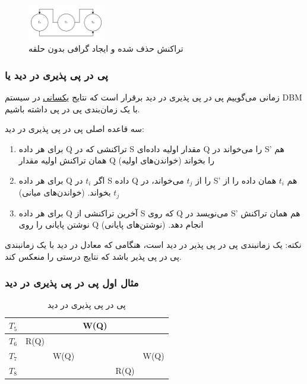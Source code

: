 \documentclass[a4paper]{article}
\begin{document}
\begin{figure}
    \centering
    \includegraphics[width=0.3\textwidth]{umls/exp1_solved.jpg}
    \caption{تراکنش حذف شده و ایجاد گرافی بدون حلقه}
    \label{fig: diagram}
\end{figure}

\subsubsection{پی در پی پذیری در دید یا }

زمانی می‌گوییم پی در پی پذیری در دید برقرار است که نتایج \underline{یکسانی} در
سیستم DBM با یک زمان‌بندی پی در پی داشته باشیم.

سه قاعده اصلی پی در پی پذیری در دید:

\begin{enumerate}
    \item برای هر داده Q تراکنشی که در S مقدار اولیه داده‌ای Q  را می‌خواند در
    S' هم همان تراکنش اولیه مقدار Q را بخواند (خواندن‌های اولیه)
    \item برای هر داده‌ Q اگر $t_{i}$ در S داده‌ Q را از $t_{j}$ می‌خواند، در S'
    هم $t_{i}$ همان داده‌ را از $t_{j}$ بخواند. (خواندن‌های میانی)
    \item برای هر داده Q آخرین تراکنشی از S که روی Q می‌نویسد در S' هم همان
    تراکنش نوشتن پایانی را روی Q انجام دهد. (نوشتن‌های پایانی)
\end{enumerate}

نکته: یک زمانبندی پی در پی پذیر در دید است، هنگامی که معادل در دید با یک
زمانبندی پی در پی پذیر باشد که نتایج درستی را منعکس کند.

\subsubsection{مثال اول پی در پی پذیری در دید}

\begin{LTR}
    \begin{table}[h]
        \centering
        \begin{RTL}
            \caption{پی در پی پذیری در دید}
        \end{RTL}
        \begin{tabular}{c|c|c|c|c|c}
            $T_{5}$ & & & W(Q) & & \\ \hline
            $T_{6}$ & R(Q) & & & &  \\ \hline
            $T_{7}$ & & W(Q) & & & W(Q) \\ \hline
            $T_{8}$ & & & & R(Q) & \\
        \end{tabular}
    \end{table}
\end{LTR}
\end{document}
